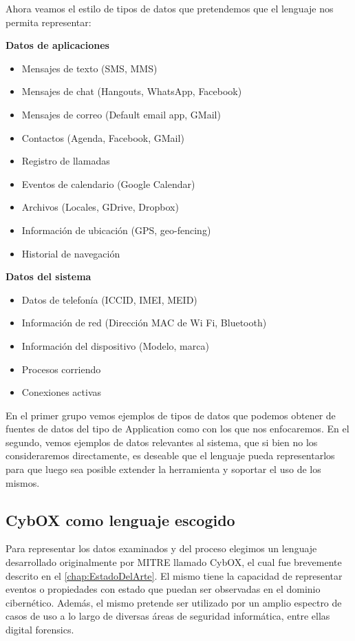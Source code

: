 Ahora veamos el estilo de tipos de datos que pretendemos que el lenguaje nos permita representar:

\textbf{Datos de aplicaciones}
\begin{itemize}
\item Mensajes de texto (SMS, MMS)
\item Mensajes de chat (Hangouts, WhatsApp, Facebook)
\item Mensajes de correo (Default email app, GMail)
\item Contactos (Agenda, Facebook, GMail)
\item Registro de llamadas
\item Eventos de calendario (Google Calendar)
\item Archivos (Locales, GDrive, Dropbox)
\item Información de ubicación (GPS, geo-fencing)
\item Historial de navegación
\end{itemize}

\textbf{Datos del sistema}
\begin{itemize}
\item Datos de telefonía (ICCID, IMEI, MEID)
\item Información de red (Dirección MAC de Wi Fi, Bluetooth)
\item Información del dispositivo (Modelo, marca)
\item Procesos corriendo
\item Conexiones activas
\end{itemize}

En el primer grupo vemos ejemplos de tipos de datos que podemos obtener de fuentes de datos del tipo de Application como con los que nos enfocaremos. En el segundo, vemos ejemplos de datos relevantes al sistema, que si bien no los consideraremos directamente, es deseable que el lenguaje pueda representarlos para que luego sea posible extender la herramienta y soportar el uso de los mismos.

\subsection{CybOX como lenguaje escogido}
Para representar los datos examinados y del proceso elegimos un lenguaje desarrollado originalmente por MITRE llamado CybOX, el cual fue brevemente descrito en el \autoref{chap:EstadoDelArte}. El mismo tiene la capacidad de representar eventos o propiedades con estado que puedan ser observadas en el dominio cibernético. Además, el mismo pretende ser utilizado por un amplio espectro de casos de uso a lo largo de diversas áreas de seguridad informática, entre ellas digital forensics.

